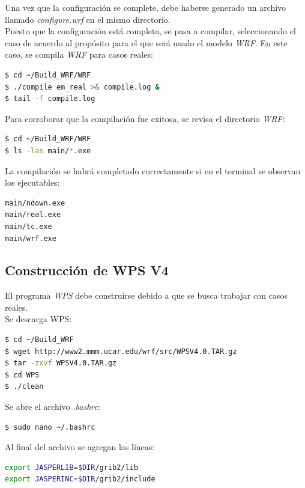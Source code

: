 \documentclass[12pt,letter]{article}
\begin{document}
\noindent Una vez que la configuraci\'on se complete, debe haberse generado un archivo llamado \textit{configure.wrf} en el mismo directorio.\\

\noindent Puesto que la configuraci\'on est\'a completa, se pasa a compilar, seleccionando el caso de acuerdo al prop\'osito para el que ser\'a usado el modelo \textit{WRF}. En este caso, se compila \textit{WRF} para casos reales:

\begin{lstlisting}[language=bash]
$ cd ~/Build_WRF/WRF
$ ./compile em_real >& compile.log &
$ tail -f compile.log
\end{lstlisting}

\noindent Para corroborar que la compilaci\'on fue exitosa, se revisa el directorio \textit{WRF}:
\begin{lstlisting}[language=bash]
$ cd ~/Build_WRF/WRF
$ ls -las main/*.exe
\end{lstlisting}

\noindent La compilaci\'on se habr\'a completado correctamente si en el terminal se observan los ejecutables:

\begin{lstlisting}[language=bash]
main/ndown.exe
main/real.exe
main/tc.exe
main/wrf.exe
\end{lstlisting}


\subsection*{Construcci\'on de WPS V4}
El programa \textit{WPS} debe construirse debido a que se busca trabajar con casos reales.\\

\noindent Se descarga WPS:
\begin{lstlisting}[language=bash]
$ cd ~/Build_WRF
$ wget http://www2.mmm.ucar.edu/wrf/src/WPSV4.0.TAR.gz
$ tar -zxvf WPSV4.0.TAR.gz
$ cd WPS
$ ./clean
\end{lstlisting}

\noindent Se abre el archivo \textit{.bashrc}:
\begin{lstlisting}[language=bash]
$ sudo nano ~/.bashrc
\end{lstlisting}

\noindent Al final del archivo se agregan las l\'ineas:
\begin{lstlisting}[language=bash]
export JASPERLIB=$DIR/grib2/lib
export JASPERINC=$DIR/grib2/include
\end{lstlisting}
\end{document}
